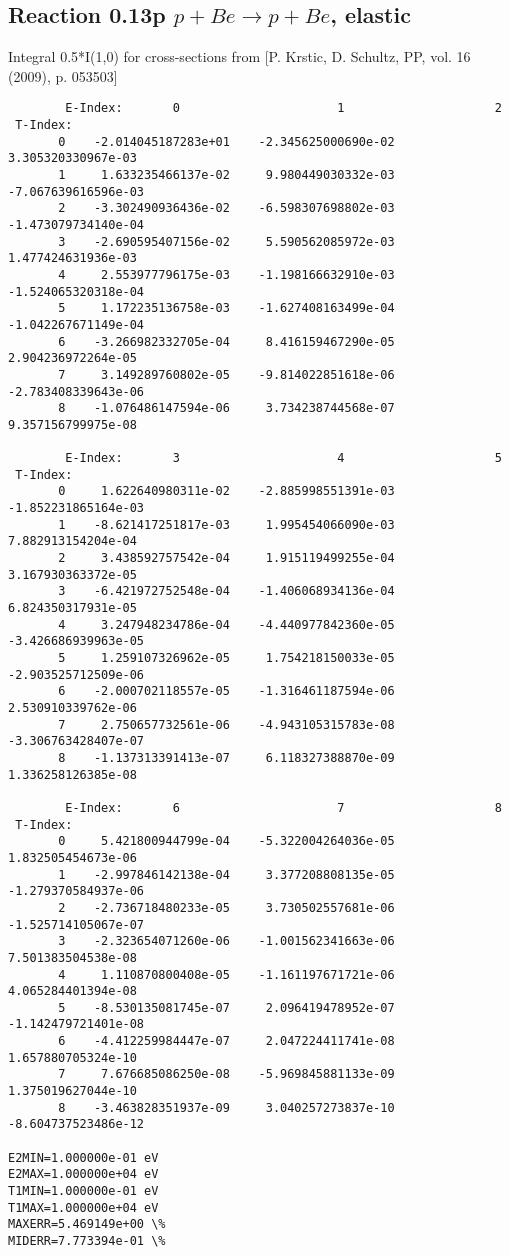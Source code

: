 \documentclass[12pt,dvipdfmx]{article}
\begin{document}
\subsection{
Reaction 0.13p  $p + Be \rightarrow p + Be$, elastic}

Integral 0.5*I(1,0) for cross-sections from [P. Krstic, D. Schultz, PP, vol. 16 (2009), p. 053503]

\begin{small}\begin{verbatim}
        E-Index:       0                      1                     2
 T-Index:
       0    -2.014045187283e+01    -2.345625000690e-02     3.305320330967e-03
       1     1.633235466137e-02     9.980449030332e-03    -7.067639616596e-03
       2    -3.302490936436e-02    -6.598307698802e-03    -1.473079734140e-04
       3    -2.690595407156e-02     5.590562085972e-03     1.477424631936e-03
       4     2.553977796175e-03    -1.198166632910e-03    -1.524065320318e-04
       5     1.172235136758e-03    -1.627408163499e-04    -1.042267671149e-04
       6    -3.266982332705e-04     8.416159467290e-05     2.904236972264e-05
       7     3.149289760802e-05    -9.814022851618e-06    -2.783408339643e-06
       8    -1.076486147594e-06     3.734238744568e-07     9.357156799975e-08

        E-Index:       3                      4                     5
 T-Index:
       0     1.622640980311e-02    -2.885998551391e-03    -1.852231865164e-03
       1    -8.621417251817e-03     1.995454066090e-03     7.882913154204e-04
       2     3.438592757542e-04     1.915119499255e-04     3.167930363372e-05
       3    -6.421972752548e-04    -1.406068934136e-04     6.824350317931e-05
       4     3.247948234786e-04    -4.440977842360e-05    -3.426686939963e-05
       5     1.259107326962e-05     1.754218150033e-05    -2.903525712509e-06
       6    -2.000702118557e-05    -1.316461187594e-06     2.530910339762e-06
       7     2.750657732561e-06    -4.943105315783e-08    -3.306763428407e-07
       8    -1.137313391413e-07     6.118327388870e-09     1.336258126385e-08

        E-Index:       6                      7                     8
 T-Index:
       0     5.421800944799e-04    -5.322004264036e-05     1.832505454673e-06
       1    -2.997846142138e-04     3.377208808135e-05    -1.279370584937e-06
       2    -2.736718480233e-05     3.730502557681e-06    -1.525714105067e-07
       3    -2.323654071260e-06    -1.001562341663e-06     7.501383504538e-08
       4     1.110870800408e-05    -1.161197671721e-06     4.065284401394e-08
       5    -8.530135081745e-07     2.096419478952e-07    -1.142479721401e-08
       6    -4.412259984447e-07     2.047224411741e-08     1.657880705324e-10
       7     7.676685086250e-08    -5.969845881133e-09     1.375019627044e-10
       8    -3.463828351937e-09     3.040257273837e-10    -8.604737523486e-12

E2MIN=1.000000e-01 eV
E2MAX=1.000000e+04 eV
T1MIN=1.000000e-01 eV
T1MAX=1.000000e+04 eV
MAXERR=5.469149e+00 \%
MIDERR=7.773394e-01 \%
\end{verbatim}\end{small}
\newpage
\end{document}
